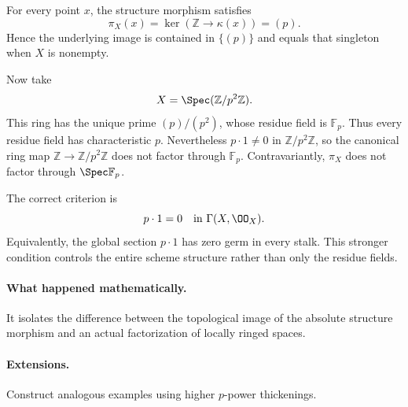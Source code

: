 \begin{solution}
For every point $x$, the structure morphism satisfies
\[
\pi_X(x)=\ker(\mathbb Z\to\kappa(x))=(p).
\]
Hence the underlying image is contained in $\{(p)\}$ and equals that singleton when $X$ is
nonempty.

Now take
\[
X=\Spec(\mathbb Z/p^2\mathbb Z).
\]
This ring has the unique prime $(p)/(p^2)$, whose residue field is $\mathbb F_p$.  Thus every
residue field has characteristic $p$.  Nevertheless $p\cdot1\neq0$ in
$\mathbb Z/p^2\mathbb Z$, so the canonical ring map $\mathbb Z\to\mathbb Z/p^2\mathbb Z$ does not
factor through $\mathbb F_p$.  Contravariantly, $\pi_X$ does not factor through
$\Spec\mathbb F_p$.

The correct criterion is
\[
p\cdot1=0\quad\text{in }\Gamma(X,\OO_X).
\]
Equivalently, the global section $p\cdot1$ has zero germ in every stalk.  This stronger condition
controls the entire scheme structure rather than only the residue fields.
\end{solution}

\paragraph{What happened mathematically.}
It isolates the difference between the topological image of the absolute structure morphism and an actual factorization of locally ringed spaces.

\paragraph{Extensions.}
Construct analogous examples using higher $p$-power thickenings.
\fi
